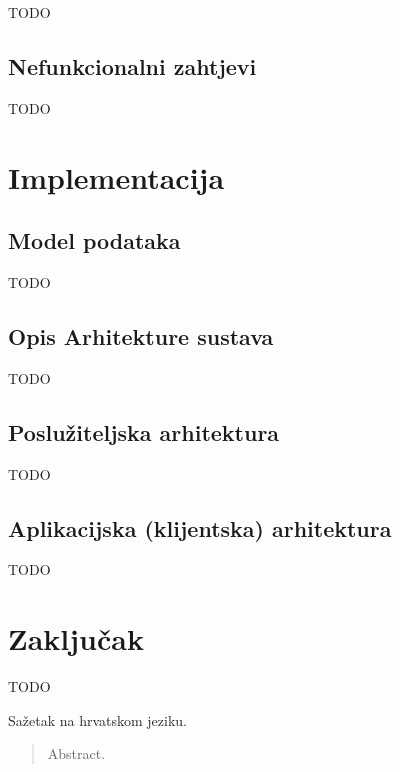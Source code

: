 \documentclass[times, utf8, diplomski, numeric]{fer}
\begin{document}
TODO


\section{Nefunkcionalni zahtjevi}

TODO



\chapter{Implementacija}


\section{Model podataka}

TODO


\section{Opis Arhitekture sustava}

TODO


\section{Poslužiteljska arhitektura}

TODO


\section{Aplikacijska (klijentska) arhitektura}

TODO



\chapter{Zaključak}

TODO







\begin{sazetak}
Sažetak na hrvatskom jeziku.

\end{sazetak}

\begin{abstract}
Abstract.

\end{abstract}
\end{document}
